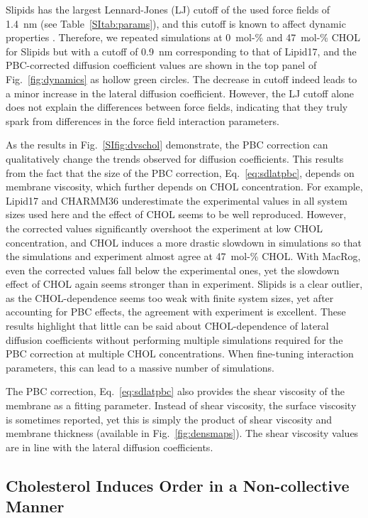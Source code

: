 \documentclass[journal=jctcce]{achemso}
\begin{document}
Slipids has the largest Lennard-Jones (LJ) cutoff of the used force fields of 1.4~nm (see Table~\ref{SItab:params}), and this cutoff is known to affect dynamic properties \cite{leonard2018comparison}. Therefore, we repeated simulations at 0~mol-\% and 47~mol-\% CHOL for Slipids but with a cutoff of 0.9~nm corresponding to that of Lipid17, and the PBC-corrected diffusion coefficient values are shown in the top panel of Fig.~\ref{fig:dynamics} as hollow green circles. The decrease in cutoff indeed leads to a minor increase in the lateral diffusion coefficient. However, the LJ cutoff alone does not explain the differences between force fields, indicating that they truly spark from differences in the force field interaction parameters.

As the results in Fig.~\ref{SIfig:dvschol} demonstrate, the PBC correction can qualitatively change the trends observed for diffusion coefficients. This results from the fact that the size of the PBC correction, Eq.~\eqref{eq:sdlatpbc}, depends on membrane viscosity, which further depends on CHOL concentration. For example, Lipid17 and CHARMM36 underestimate the experimental values in all system sizes used here and the effect of CHOL seems to be well reproduced. However, the corrected values significantly overshoot the experiment at low CHOL concentration, and CHOL induces a more drastic slowdown in simulations so that the simulations and experiment almost agree at 47~mol-\% CHOL. With MacRog, even the corrected values fall below the experimental ones, yet the slowdown effect of CHOL again seems stronger than in experiment. Slipids is a clear outlier, as the CHOL-dependence seems too weak with finite system sizes, yet after accounting for PBC effects, the agreement with experiment is excellent. These results highlight that little can be said about CHOL-dependence of lateral diffusion coefficients without performing multiple simulations required for the PBC correction at multiple CHOL concentrations. When fine-tuning interaction parameters, this can lead to a massive number of simulations.

The PBC correction, Eq.~\eqref{eq:sdlatpbc} also provides the shear viscosity of the membrane as a fitting parameter. Instead of shear viscosity, the surface viscosity is sometimes reported, yet this is simply the product of shear viscosity and membrane thickness (available in Fig.~\ref{fig:densmaps}). The shear viscosity values are in line with the lateral diffusion coefficients. 

\subsection{Cholesterol Induces Order in a Non-collective Manner}
\end{document}
